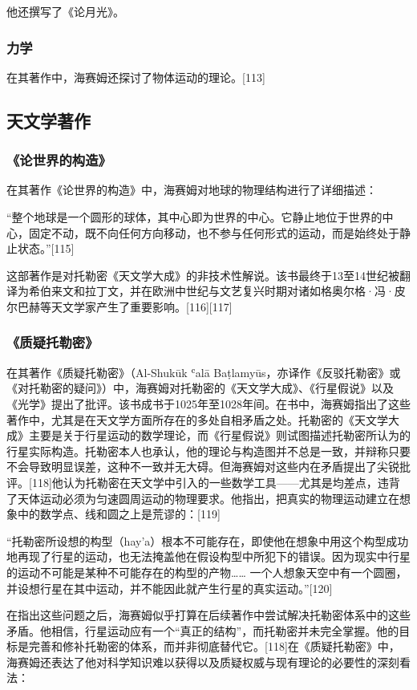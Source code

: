 他还撰写了《论月光》。
\subsubsection{力学}
在其著作中，海赛姆还探讨了物体运动的理论。[113]
\subsection{天文学著作}
\subsubsection{《论世界的构造》}
在其著作《论世界的构造》中，海赛姆对地球的物理结构进行了详细描述：

“整个地球是一个圆形的球体，其中心即为世界的中心。它静止地位于世界的中心，固定不动，既不向任何方向移动，也不参与任何形式的运动，而是始终处于静止状态。”[115]

这部著作是对托勒密《天文学大成》的非技术性解说。该书最终于13至14世纪被翻译为希伯来文和拉丁文，并在欧洲中世纪与文艺复兴时期对诸如格奥尔格·冯·皮尔巴赫等天文学家产生了重要影响。[116][117]
\subsubsection{《质疑托勒密》}
在其著作《质疑托勒密》（Al-Shukūk ʿalā Baṭlamyūs，亦译作《反驳托勒密》或《对托勒密的疑问》）中，海赛姆对托勒密的《天文学大成》、《行星假说》以及《光学》提出了批评。该书成书于1025年至1028年间。在书中，海赛姆指出了这些著作中，尤其是在天文学方面所存在的多处自相矛盾之处。托勒密的《天文学大成》主要是关于行星运动的数学理论，而《行星假说》则试图描述托勒密所认为的行星实际构造。托勒密本人也承认，他的理论与构造图并不总是一致，并辩称只要不会导致明显误差，这种不一致并无大碍。但海赛姆对这些内在矛盾提出了尖锐批评。[118]他认为托勒密在天文学中引入的一些数学工具——尤其是均差点，违背了天体运动必须为匀速圆周运动的物理要求。他指出，把真实的物理运动建立在想象中的数学点、线和圆之上是荒谬的：[119]

“托勒密所设想的构型（hay’a）根本不可能存在，即使他在想象中用这个构型成功地再现了行星的运动，也无法掩盖他在假设构型中所犯下的错误。因为现实中行星的运动不可能是某种不可能存在的构型的产物……
一个人想象天空中有一个圆圈，并设想行星在其中运动，并不能因此就产生行星的真实运动。”[120]

在指出这些问题之后，海赛姆似乎打算在后续著作中尝试解决托勒密体系中的这些矛盾。他相信，行星运动应有一个“真正的结构”，而托勒密并未完全掌握。他的目标是完善和修补托勒密的体系，而并非彻底替代它。[118]在《质疑托勒密》中，海赛姆还表达了他对科学知识难以获得以及质疑权威与现有理论的必要性的深刻看法：

